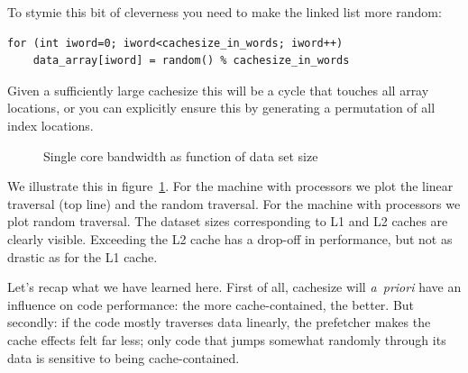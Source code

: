 To stymie this bit of cleverness you need to make the linked list more random:
\begin{lstlisting}
for (int iword=0; iword<cachesize_in_words; iword++)
    data_array[iword] = random() % cachesize_in_words
\end{lstlisting}
Given a sufficiently large cachesize this will be a cycle
that touches all array locations,
or you can explicitly ensure this by generating a permutation of all index locations.

\begin{figure}[t]
  \pgfplotsset{table/col sep=comma}
  \caption{Single core bandwidth as function of data set size}
  \label{fig:core-bandwidth}
\end{figure}

We illustrate this in figure~\ref{fig:core-bandwidth}.
For the  machine
with  processors
we plot the linear traversal (top line) and the random traversal.
For the  machine
with  processors
we plot random traversal.
The dataset sizes corresponding to L1 and L2 caches
are clearly visible.
Exceeding the L2 cache has a drop-off in performance,
but not as drastic as for the L1 cache.

Let's recap what we have learned here.
First of all, cachesize will \emph{a~priori} have an influence on code performance:
the more cache-contained, the better.
But secondly: if the code mostly traverses data linearly, the prefetcher
makes the cache effects felt far less;
only code that jumps somewhat randomly through its data
is sensitive to being cache-contained.

